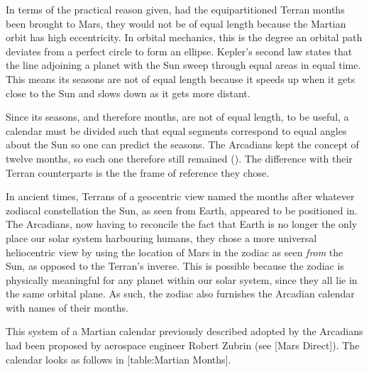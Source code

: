 In terms of the practical reason given, had the equipartitioned Terran months been brought to Mars, they would not be of equal length because the Martian orbit has high eccentricity. In orbital mechanics, this is the degree an orbital path deviates from a perfect circle to form an ellipse. Kepler's second law states that the line adjoining a planet with the Sun sweep through equal areas in equal time. This means its seasons are not of equal length because it speeds up when it gets close to the Sun and slows down as it gets more distant.

Since its seasons, and therefore months, are not of equal length, to be useful, a calendar must be divided such that equal segments correspond to equal angles about the Sun so one can predict the seasons. The Arcadians kept the concept of twelve months, so each one therefore still remained  (). The difference with their Terran counterparts is the the frame of reference they chose.

In ancient times, Terrans of a geocentric view named the months after whatever zodiacal constellation the Sun, as seen from Earth, appeared to be positioned in. The Arcadians, now having to reconcile the fact that Earth is no longer the only place our solar system harbouring humans, they chose a more universal heliocentric view by using the location of Mars in the zodiac as seen {\it from} the Sun, as opposed to the Terran's inverse. This is possible because the zodiac is physically meaningful for any planet within our solar system, since they all lie in the same orbital plane. As such, the zodiac also furnishes the Arcadian calendar with names of their months.

This system of a Martian calendar previously described adopted by the Arcadians had been proposed by aerospace engineer Robert Zubrin (see [Mars Direct]). The calendar looks as follows in [table:Martian Months].
\crlf

